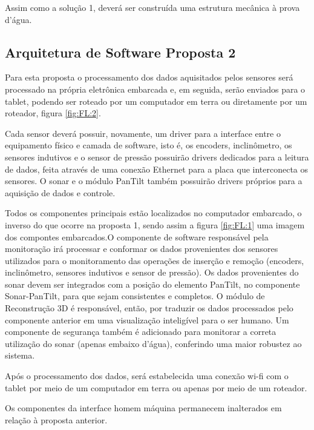 Assim como a solução 1, deverá ser construída uma estrutura mecânica à prova d’água.

\subsection{Arquitetura de Software Proposta 2}

Para esta proposta o processamento dos dados aquisitados pelos sensores será
processado na própria eletrônica embarcada e, em seguida,
 serão enviados para o tablet, podendo ser roteado por um computador em terra ou
 diretamente por um roteador, figura \ref{fig:FL:2}.
 

Cada sensor deverá possuir, novamente, um driver para a interface entre o
equipamento físico e camada de software, isto é, os encoders, inclinômetro, os
sensores indutivos e o sensor de pressão possuirão drivers dedicados para a
leitura de dados, feita através de uma conexão Ethernet para a placa que
interconecta os sensores. O sonar e o módulo PanTilt também possuirão drivers
próprios para a aquisição de dados e controle.

Todos os componentes principais estão localizados no computador embarcado, o
inverso do que ocorre na proposta 1, sendo assim a figura \ref{fig:FL:1} uma
imagem dos compontes embarcados.O componente de software responsável pela
monitoração irá processar e conformar os dados provenientes dos sensores
utilizados para o monitoramento das operações de inserção e remoção (encoders,
inclinômetro, sensores indutivos e sensor de pressão). Os dados provenientes do
sonar devem ser integrados com a posição do elemento PanTilt, no componente
Sonar-PanTilt, para que sejam consistentes e completos. O módulo de Reconstrução
3D é responsável, então, por  traduzir os dados processados pelo componente
anterior em uma visualização inteligível para o ser humano. Um componente de
segurança também é adicionado para monitorar a correta utiliza\-ção do sonar
(apenas embaixo d’água), conferindo uma maior robustez ao sistema.

Após o processamento dos dados, será estabelecida uma conexão wi-fi com o tablet
por meio de um computador em terra ou
 apenas por meio de um roteador.
 
Os componentes da interface homem máquina permanecem inalterados em relação à
proposta anterior.